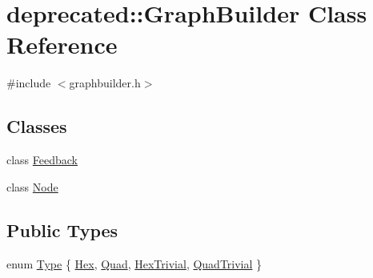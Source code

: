 \hypertarget{classdeprecated_1_1_graph_builder}{}\section{deprecated\+::Graph\+Builder Class Reference}
\label{classdeprecated_1_1_graph_builder}


{\ttfamily \#include $<$graphbuilder.\+h$>$}

\subsection*{Classes}
\begin{DoxyCompactItemize}
\item 
class \mbox{\hyperlink{classdeprecated_1_1_graph_builder_1_1_feedback}{Feedback}}
\item 
class \mbox{\hyperlink{classdeprecated_1_1_graph_builder_1_1_node}{Node}}
\end{DoxyCompactItemize}
\subsection*{Public Types}
\begin{DoxyCompactItemize}
\item 
enum \mbox{\hyperlink{classdeprecated_1_1_graph_builder_a7f373eeb62c478a200ab1f3cfa4ef6f3}{Type}} \{ \mbox{\hyperlink{classdeprecated_1_1_graph_builder_a7f373eeb62c478a200ab1f3cfa4ef6f3a51d325fcb5ce0620e77c98745875ef0a}{Hex}}, 
\mbox{\hyperlink{classdeprecated_1_1_graph_builder_a7f373eeb62c478a200ab1f3cfa4ef6f3afaf282b4bdda0789ae5317bf7e5dc841}{Quad}}, 
\mbox{\hyperlink{classdeprecated_1_1_graph_builder_a7f373eeb62c478a200ab1f3cfa4ef6f3a5375ed031da3b69317f3c3be7fc7b409}{Hex\+Trivial}}, 
\mbox{\hyperlink{classdeprecated_1_1_graph_builder_a7f373eeb62c478a200ab1f3cfa4ef6f3aa04d6d2bca766d114ce518aeb8423fbe}{Quad\+Trivial}}
 \}
\end{DoxyCompactItemize}
